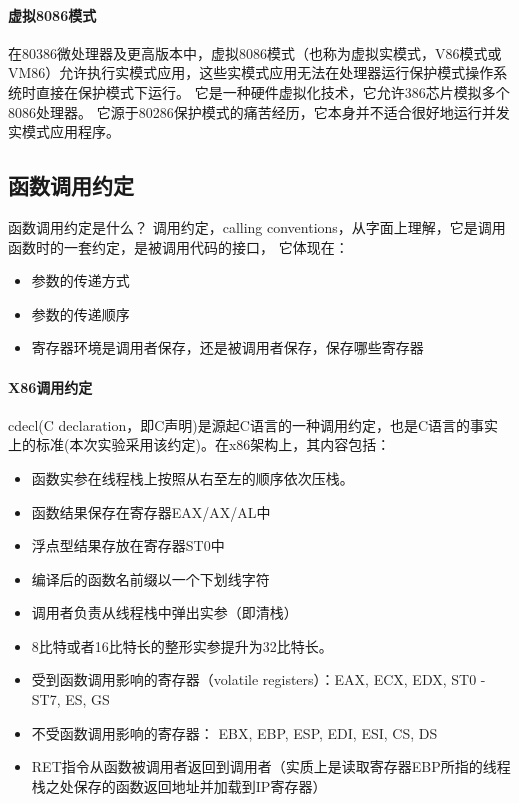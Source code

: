 \documentclass[a4paper, 11pt]{article} %
\begin{document}
\paragraph{虚拟8086模式}  \cite{wikiv8086}
在80386微处理器及更高版本中，虚拟8086模式（也称为虚拟实模式，V86模式或VM86）允许执行实模式应用，这些实模式应用无法在处理器运行保护模式操作系统时直接在保护模式下运行。 它是一种硬件虚拟化技术，它允许386芯片模拟多个8086处理器。 它源于80286保护模式的痛苦经历，它本身并不适合很好地运行并发实模式应用程序。

\subsection{函数调用约定}

函数调用约定是什么？
调用约定，calling conventions，从字面上理解，它是调用函数时的一套约定，是被调用代码的接口，
它体现在：
\begin{itemize} 
  \item 参数的传递方式
  \item 参数的传递顺序
  \item 寄存器环境是调用者保存，还是被调用者保存，保存哪些寄存器
\end{itemize}
\paragraph{X86调用约定}
cdecl(C declaration，即C声明)是源起C语言的一种调用约定，也是C语言的事实上的标准(本次实验采用该约定)。在x86架构上，其内容包括：
\begin{itemize} 
  \item 函数实参在线程栈上按照从右至左的顺序依次压栈。
  \item 函数结果保存在寄存器EAX/AX/AL中
  \item 浮点型结果存放在寄存器ST0中
  \item 编译后的函数名前缀以一个下划线字符
  \item 调用者负责从线程栈中弹出实参（即清栈）
  \item 8比特或者16比特长的整形实参提升为32比特长。
  \item 受到函数调用影响的寄存器（volatile registers）：EAX, ECX, EDX, ST0 - ST7, ES, GS
  \item 不受函数调用影响的寄存器： EBX, EBP, ESP, EDI, ESI, CS, DS
  \item RET指令从函数被调用者返回到调用者（实质上是读取寄存器EBP所指的线程栈之处保存的函数返回地址并加载到IP寄存器）
\end{itemize}
\end{document}
